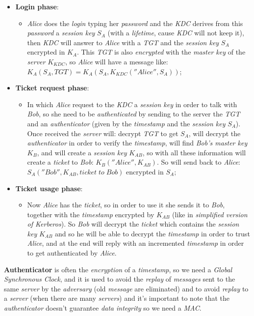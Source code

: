 \documentclass{article}
\begin{document}
\begin{itemize}
\item \textbf{Login phase}:
\begin{itemize}
\item \emph{Alice} does the \emph{login} typing her \emph{password} and the \emph{KDC} derives from this \emph{password} a \emph{session key} $S_A$ (with a \emph{lifetime}, cause \emph{KDC} will not keep it), then \emph{KDC} will answer to \emph{Alice} with a \emph{TGT} and the\emph{ session key} $S_A$ encrypted in $K_A$. This \emph{TGT} is also \emph{encrypted} with the \emph{master key} of the \emph{server} $K_{KDC}$, so \emph{Alice} will have a message like: $K_A (S_A , TGT) = K_A (S_A, K_{KDC} (''Alice'',S_A))$;
\end{itemize}
\item \textbf{Ticket request phase}:
\begin{itemize}
\item In which \emph{Alice} request to the \emph{KDC} a \emph{session key} in order to talk with \emph{Bob}, so she need to be \emph{authenticated} by sending to the server the \emph{TGT} and an \emph{authenticator} (given by the \emph{timestamp} and the \emph{session key} $S_A$). Once received the \emph{server} will: decrypt \emph{TGT} to get $S_A$, will decrypt the \emph{authenticator} in order to verify the \emph{timestamp}, will find  \emph{Bob's master key} $K_B$, and will create a \emph{session key} $K_{AB}$, so with all these information will create a \emph{ticket} to \emph{Bob}: $K_B(''Alice'',K_{AB})$. So will send back to \emph{Alice}: $S_A(''Bob'', K_{AB}, ticket\; to\; Bob)$ encrypted in $S_A$;
\end{itemize}
\clearpage
\item \textbf{Ticket usage phase}:
\begin{itemize}
\item Now \emph{Alice} has the \emph{ticket}, so in order to use it she sends it to \emph{Bob}, together with the \emph{timestamp} encrypted by $K_{AB}$ (like in \emph{simplified version of Kerberos}). So \emph{Bob} will decrypt the \emph{ticket} which contains the \emph{session key} $K_{AB}$ and so he will be able to decrypt the \emph{timestamp} in order to trust \emph{Alice}, and at the end will reply with an incremented \emph{timestamp} in order to get authenticated by \emph{Alice}. 
\end{itemize}
\end{itemize}
\textbf{Authenticator} is often the \emph{encryption} of a \emph{timestamp}, so we need a \emph{Global Synchronous Clock}, and it is used to avoid the \emph{replay} of \emph{messages} sent to the same \emph{server} by the \emph{adversary} (old \emph{message} are eliminated) and to avoid \emph{replay} to a \emph{server} (when there are many \emph{servers}) and it's important to note that the \emph{authenticator} doesn't guarantee \emph{data integrity} so we need a \emph{MAC}. \\\\
\end{document}
